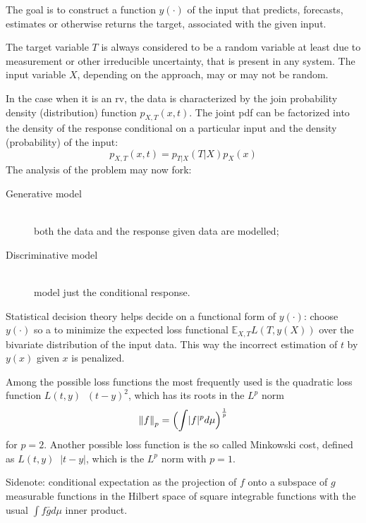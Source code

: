 \documentclass[a4paper]{article}
\newcommand{\abs}[1]{{\left | #1 \right |}}
\newcommand{\nrm}[1]{{\left\| #1 \right \|}}
\newcommand{\Ex}[0]{{\mathbb{E}}}
\newcommand{\defn}{\mathop{\overset{\Delta}{=}}\nolimits}
\begin{document}
The goal is to construct a function $y(\cdot)$ of the input that predicts, forecasts,
estimates or otherwise returns the target, associated with the given input.

The target variable $T$ is always considered to be a random variable at least due
to measurement or other irreducible uncertainty, that is present in any system.
The input variable $X$, depending on the approach, may or may not be random.

In the case when it is an rv, the data is characterized by the join probability
density (distribution) function $p_{X,T}(x,t)$.
The joint pdf can be factorized into the density of the response conditional on
a particular input and the density (probability) of the input:
\[p_{X,T}(x,t) = p_{T\rvert X}(T\rvert X) p_X(x) \]
The analysis of the problem may now fork:
\begin{description}
	\item[Generative model] \hfill \\
		both the data and the response given data are modelled;
	\item[Discriminative model] \hfill \\
		model just the conditional response.
\end{description}

Statistical decision theory helps decide on a functional form of $y(\cdot)$:
choose $y(\cdot)$ so a to minimize the expected loss functional $\Ex_{X,T} L(T,y(X))$
over the bivariate distribution of the input data.
This way the incorrect estimation of $t$ by $y(x)$ given $x$ is penalized.

Among the possible loss functions the most frequently used is the quadratic
loss function $L(t,y) \defn (t-y)^2$, which has its roots in the $L^p$ norm
\[\nrm{f}_p = \Bigl(\int \lvert f\rvert^p d\mu\Bigr)^\frac{1}{p}\]
for $p = 2$. Another possible loss function is the so called Minkowski cost,
defined as $L(t,y) \defn \abs{t-y}$, which is the $L^p$ norm with $p=1$.

Sidenote: conditional expectation as the projection of $f$ onto a subspace of $g$
measurable functions in the Hilbert space of square integrable functions with the
usual $\int f\bar{g} d\mu$ inner product.

\end{document}
